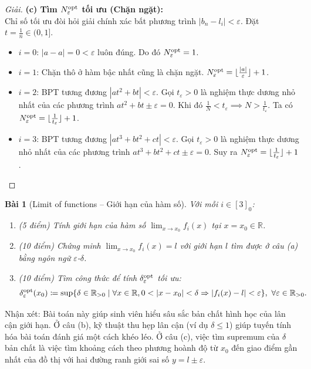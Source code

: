 \documentclass{article}
\newtheorem{baitoan}{Bài}
\begin{document}
\begin{proof}[Giải]
	\textbf{(c) Tìm $N_\varepsilon^{\rm opt}$ tối ưu (Chặn ngặt):}\\
	Chỉ số tối ưu đòi hỏi giải chính xác bất phương trình $|b_n - l_i| < \varepsilon$. Đặt $t = \frac{1}{n} \in (0, 1]$.
	\begin{itemize}
		\item $i=0$: $|a-a| = 0 < \varepsilon$ luôn đúng. Do đó $N_\varepsilon^{\rm opt} = 1$.
		\item $i=1$: Chặn thô ở hàm bậc nhất cũng là chặn ngặt. $N_\varepsilon^{\rm opt} = \lfloor \frac{|a|}{\varepsilon} \rfloor + 1$.
		\item $i=2$: BPT tương đương $|at^2+bt| < \varepsilon$. Gọi $t_\varepsilon > 0$ là nghiệm thực dương nhỏ nhất của các phương trình $at^2+bt \pm \varepsilon = 0$. Khi đó $\frac{1}{N} < t_\varepsilon \implies N > \frac{1}{t_\varepsilon}$. Ta có $N_\varepsilon^{\rm opt} = \lfloor \frac{1}{t_\varepsilon} \rfloor + 1$.
		\item $i=3$: BPT tương đương $|at^3+bt^2+ct| < \varepsilon$. Gọi $t_\varepsilon > 0$ là nghiệm thực dương nhỏ nhất của các phương trình $at^3+bt^2+ct \pm \varepsilon = 0$. Suy ra $N_\varepsilon^{\rm opt} = \lfloor \frac{1}{t_\varepsilon} \rfloor + 1$.
	\end{itemize}
\end{proof}

\begin{baitoan}[Limit of functions -- Giới hạn của hàm số]
	Với mỗi $i\in[3]_0$:
	\begin{enumerate}[label=(\alph*)]
		\item {\rm(5 điểm)} Tính giới hạn của hàm số $\lim_{x\to x_0} f_i(x)$ tại $x = x_0\in\mathbb{R}$.
		\item {\rm(10 điểm)} Chứng minh $\lim_{x\to x_0} f_i(x) = l$ với giới hạn $l$ tìm được ở câu (a) bằng ngôn ngữ $\varepsilon$-$\delta$.
		\item {\rm(10 điểm)} Tìm công thức để tính $\delta_\varepsilon^{\rm opt}$ tối ưu:
		\begin{equation*}
			\delta_\varepsilon^{\rm opt}(x_0) \coloneqq \sup \{ \delta \in \mathbb{R}_{>0} \mid \forall x \in \mathbb{R}, 0 < |x - x_0| < \delta \Rightarrow |f_i(x) - l| < \varepsilon \},\ \forall\varepsilon\in\mathbb{R}_{> 0}.
		\end{equation*}
	\end{enumerate}
\end{baitoan}

\textsf{Nhận xét}: Bài toán này giúp sinh viên hiểu sâu sắc bản chất hình học của lân cận giới hạn. Ở câu (b), kỹ thuật thu hẹp lân cận (ví dụ $\delta \le 1$) giúp tuyến tính hóa bài toán đánh giá một cách khéo léo. Ở câu (c), việc tìm supremum của $\delta$ bản chất là việc tìm khoảng cách theo phương hoành độ từ $x_0$ đến giao điểm gần nhất của đồ thị với hai đường ranh giới sai số $y = l \pm \varepsilon$.
\end{document}
